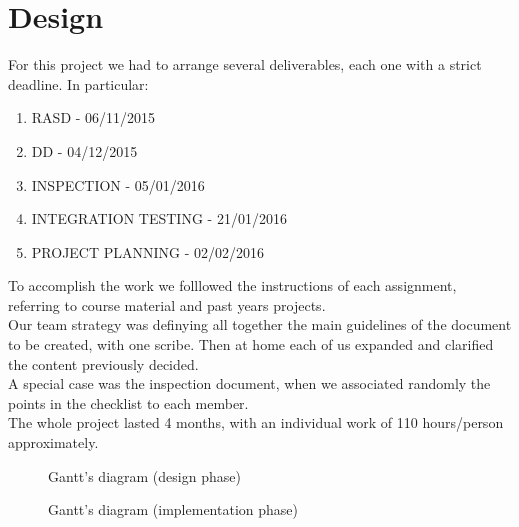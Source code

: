 \section{Design}
For this project we had to arrange several deliverables, each one with a strict deadline.
In particular:
\begin{enumerate}
\item RASD - 06/11/2015
\item DD - 04/12/2015
\item INSPECTION - 05/01/2016
\item INTEGRATION TESTING - 21/01/2016
\item PROJECT PLANNING - 02/02/2016
\end{enumerate}

To accomplish the work we folllowed the instructions of each assignment, referring 
to course material and past years projects.\\
Our team strategy was definying  all together the main guidelines of the document to be created, with one 
scribe. Then at home each of us expanded and clarified the content previously decided.\\
A special case was the inspection document, when we associated randomly the points in the checklist to each member.\\
The whole project lasted 4 months, with an individual work of 110 hours/person approximately.

\begin{center}
\begin{figure} [h]

\noindent{}
\caption{Gantt's diagram (design phase)}
\vspace{6mm}
\noindent{}
\caption{Gantt's diagram (implementation phase)}
%

 \end{figure}
\end{center}

